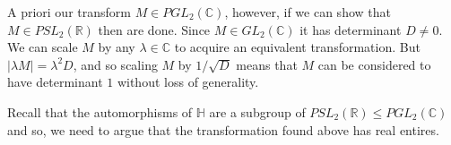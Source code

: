 \documentclass[12pt,letterpaper,boxed]{hmcpset}
\newcommand{\R}{\mathbb R}
\newcommand{\C}{\mathbb C}
\newcommand{\abs}[1]{\left|#1\right|}
\begin{document}
\begin{solution}
A priori our transform $M \in PGL_2(\C)$, however, if we can show that $M \in
PSL_2(\R)$ then are done. Since $M \in GL_2(\C)$ it has determinant $D
\neq 0$. We can scale $M$ by any $\lambda \in \C$ to acquire an
equivalent transformation. But $\abs{\lambda M} = \lambda^2 D$,
and so scaling $M$ by $1/\sqrt{D}$ means that $M$ can be considered to
have determinant $1$ without loss of generality.


Recall that the automorphisms of $\mathbb H$ are a subgroup of
$PSL_2(\R) \leq PGL_2(\C)$ and so, we need to argue that the
transformation found above has real entires.



\end{solution}
\newpage



\end{document}
